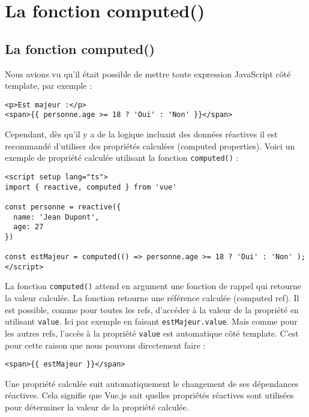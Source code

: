 \section{La fonction computed()}
\subsection{La fonction {\color{monOrange}computed()}}
Nous avions vu qu'il était possible de mettre toute expression JavaScript côté template, par exemple :
\begin{verbatim}
<p>Est majeur :</p>
<span>{{ personne.age >= 18 ? 'Oui' : 'Non' }}</span>
\end{verbatim}
Cependant, dès qu'il y a de la logique incluant des données réactives il est recommandé d'utiliser des propriétés calculées ({\color{monOrange}computed properties}). Voici un exemple de propriété calculée utilisant la fonction {\tt computed()} :
\begin{verbatim}
<script setup lang="ts">
import { reactive, computed } from 'vue'

const personne = reactive({
  name: 'Jean Dupont',
  age: 27
})

const estMajeur = computed(() => personne.age >= 18 ? 'Oui' : 'Non' );
</script>
\end{verbatim}
La fonction {\tt computed()}  attend en argument une fonction de rappel qui retourne la valeur calculée. La fonction retourne une référence calculée ({\color{monOrange}computed ref}). Il est possible, comme pour toutes les {\color{monOrange}refs}, d'accéder à la valeur de la propriété en utilisant {\tt value}. Ici par exemple en faisant {\tt estMajeur.value}. Mais comme pour les autres {\color{monOrange}refs}, l'accès à la propriété {\tt value} est automatique côté template. C'est pour cette raison que nous pouvons directement faire :
\begin{verbatim}
<span>{{ estMajeur }}</span>
\end{verbatim}
Une propriété calculée suit automatiquement le changement de ses dépendances réactives. Cela signifie que {\color{monOrange}Vue.js} sait quelles propriétés réactives sont utilisées pour déterminer la valeur de la propriété calculée.

